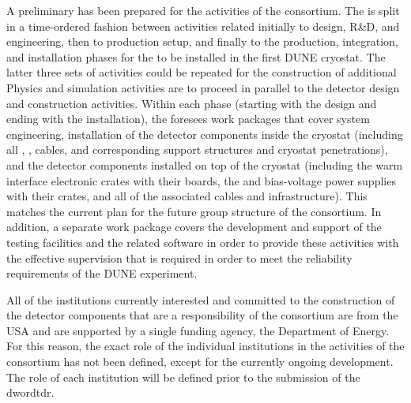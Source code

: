 A preliminary  has been prepared for the activities
of the  consortium. The  is split in a time-ordered fashion
between activities related initially to design, R\&D, and engineering, then
to production setup, and finally to the production, integration, and installation
phases for the  to be installed in the first DUNE cryostat.
The latter three sets of activities could be repeated for the construction
of additional  %
Physics and simulation
activities are to proceed in parallel to the detector design and construction activities.
Within each phase (starting with the design and ending with the installation),
the  foresees work packages that cover system engineering, installation of the detector
components inside the cryostat (including all , ,
cables, and corresponding support structures and cryostat penetrations),
and the detector components installed on top of the cryostat (including the warm
interface electronic crates with their boards, the  and bias-voltage
power supplies with their crates, and all of the associated cables and infrastructure). This
matches the current plan for the future group structure of the  consortium. 
In addition, a separate work package covers the development and support of the testing facilities and the related software in order to provide these activities with the effective supervision that is required in order to meet the reliability requirements of the DUNE experiment.

All of the institutions currently interested and committed to the construction of
the detector components that are a responsibility of the 
consortium are from the USA and are supported by a single
funding agency, the Department of Energy. For this reason, the exact role of
the individual institutions in the activities of the consortium has not been
defined, except for the currently ongoing  development. The role of
each institution will be defined prior to the submission of the dword{tdr}.
